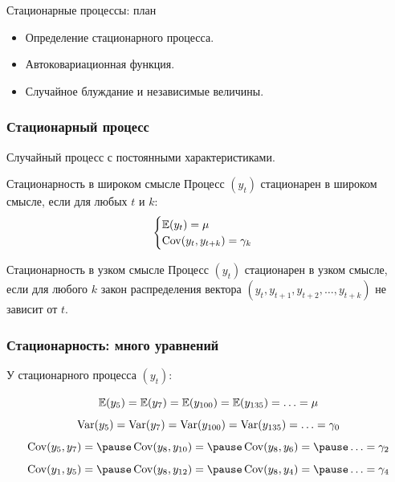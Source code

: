 
\begin{frame} %


\end{frame}



\begin{frame}{Стационарные процессы: план}
  \begin{itemize}[<+->]
    \item Определение стационарного процесса.
    \item Автоковариационная функция.
    \item Случайное блуждание и независимые величины. 
  \end{itemize}

\end{frame}

\begin{frame}
  \frametitle{Стационарный процесс}

  Случайный процесс с \alert{постоянными характеристиками}.
  \pause

  \begin{block}{Стационарность в широком смысле}
    Процесс $(y_t)$ стационарен в \alert{широком смысле}, если для любых $t$ и $k$:
    \[
    \begin{cases}
      \mathbb{E}(y_t ) = \mu \\
      \operatorname{Cov}(y_t, y_{t+k}) = \gamma_k \\          
    \end{cases}
    \]
  \end{block}

  \pause
  \begin{block}{Стационарность в узком смысле}
    Процесс $(y_t)$ стационарен в \alert{узком смысле}, если для любого $k$ 
    закон распределения вектора $(y_t, y_{t+1}, y_{t+2}, \ldots, y_{t+k})$ не зависит от $t$. 
  \end{block}
\end{frame}

\begin{frame}
  \frametitle{Стационарность: много уравнений}

  У стационарного процесса $(y_t)$:

  \[
  \mathbb{E}(y_5) = \mathbb{E}(y_7) = \mathbb{E}(y_{100}) = \mathbb{E}(y_{135}) = \ldots = \mu 
  \]
  \pause
  \[
  \operatorname{Var}(y_5) = \operatorname{Var}(y_7) = \operatorname{Var}(y_{100}) = \operatorname{Var}(y_{135}) = \ldots = \gamma_0 
  \]
  \pause
  \[
  \Cov(y_5, y_7) = \pause \Cov(y_8, y_{10}) = \pause \Cov(y_8, y_6) = \pause \ldots = \gamma_2 
  \]
  \pause
  \[
  \Cov(y_1, y_5) = \pause \Cov(y_8, y_{12}) = \pause \Cov(y_8, y_4) = \pause \ldots = \gamma_4 
  \]
  

\end{frame}


